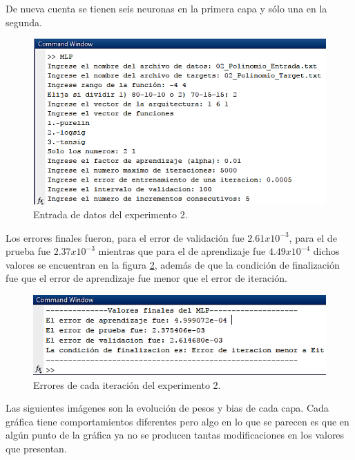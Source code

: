 \documentclass[12pt, titlepage]{article}
\begin{document}
De nueva cuenta se tienen seis neuronas en la primera capa y sólo una en la segunda.
\begin{figure}[H]
    \begin{center}
        \includegraphics[width=14cm]{2/entrada.png}
        \caption{Entrada de datos del experimento 2.}
        \label{fig:entrada2}
    \end{center}
\end{figure}
Los errores finales fueron, para el error de validación fue $2.61 x 10^{-3}$, para el de prueba fue $2.37x10^{-3}$ mientras que para el de aprendizaje fue $4.49x10^{-4}$ dichos valores se encuentran en la figura \ref{fig:salida2}, además de que la condición de finalización fue que el error de aprendizaje fue menor que el error de iteración.
\begin{figure}[H]
    \begin{center}
        \includegraphics[width=14cm]{2/salida.png}
        \caption{Errores de cada iteración del experimento 2.}
        \label{fig:salida2}
    \end{center}
\end{figure}
Las siguientes imágenes son la evolución de pesos y bias de cada capa. Cada gráfica tiene comportamientos diferentes pero algo en lo que se parecen es que en algún punto de la gráfica ya no se producen tantas modificaciones en los valores que presentan.
\end{document}
